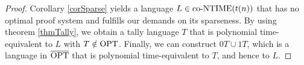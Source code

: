   \begin{proof}
    Corollary \ref{corSparse} yields a language \(L \in \text{co-NTIME}(t(n))\) that has no optimal proof system and fulfills our demands on its sparseness. By using theorem \ref{thmTally}, we obtain a tally language \(T\) that is polynomial time-equivalent to \(L\) with \(T \notin \text{OPT}\). Finally, we can construct \(0T \cup 1T\), which is a language in \(\overline{\text{OPT}}\) that is polynomial time-equivalent to \(T\), and hence to \(L\). 
  \end{proof}



 

  